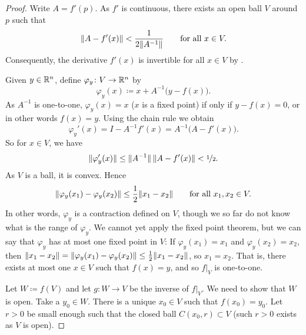 \begin{proof}
Write $A = f'(p)$.  As $f'$ is continuous, there exists an open ball
$V$ around $p$ such that
\begin{equation*}
\lVert {A-f'(x)} \rVert < \frac{1}{2\lVert {A^{-1}} \rVert}
\qquad \text{for all } x \in V.
\end{equation*}
Consequently, the derivative $f'(x)$ is invertible for all $x \in V$
by .

Given $y \in {\mathbb{R}}^n$, define $\varphi_y \colon V \to {\mathbb{R}}^n$ by
\begin{equation*}
\varphi_y (x) \coloneqq x + A^{-1}\bigl(y-f(x)\bigr) .
\end{equation*}
As $A^{-1}$ is one-to-one,
$\varphi_y(x) = x$ ($x$ is a fixed point) if only if
$y-f(x) = 0$, or in other words $f(x)=y$.  Using the chain rule we obtain
\begin{equation*}
\varphi_y'(x) = I - A^{-1} f'(x) = A^{-1} \bigl( A-f'(x) \bigr) .
\end{equation*}
So for $x \in V$, we have
\begin{equation*}
\lVert {\varphi_y'(x)} \rVert \leq \lVert {A^{-1}} \rVert \, \lVert {A-f'(x)} \rVert < \nicefrac{1}{2} .
\end{equation*}
As $V$ is a ball, it is convex.  Hence
\begin{equation*}
\lVert {\varphi_y(x_1)-\varphi_y(x_2)} \rVert \leq \frac{1}{2} \lVert {x_1-x_2} \rVert 
\qquad
\text{for all } x_1,x_2 \in V.
\end{equation*}
In other words, $\varphi_y$ is a contraction defined on $V$, though we so far
do not know what is the range of $\varphi_y$.  We cannot yet
apply the fixed
point theorem, but we can say that $\varphi_y$ 
has at most one fixed point in $V$:
If $\varphi_y(x_1) = x_1$ and
$\varphi_y(x_2) = x_2$, then
$\lVert {x_1-x_2} \rVert = \lVert {\varphi_y(x_1)-\varphi_y(x_2)} \rVert \leq
\frac{1}{2} \lVert {x_1-x_2} \rVert$, so $x_1 = x_2$.
That is, there exists at most one $x \in V$
such that $f(x) = y$, and so $f|_V$ is one-to-one.

Let $W \coloneqq f(V)$ and let $g \colon W \to V$ be the inverse of $f|_V$.
We need to show that $W$ is open.  Take a $y_0 \in W$.
There is a unique $x_0 \in V$ such that $f(x_0) = y_0$.
Let $r > 0$ be small enough such that the closed ball $C(x_0,r) \subset V$
(such $r > 0$ exists as $V$ is open).


\end{proof}
